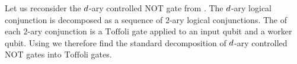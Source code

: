 \begin{example}\label{exa:mcnotDecomposition}
    Let us reconsider the $d$-ary controlled $\mathrm{NOT}$ gate from .
    The $d$-ary logical conjunction is decomposed as a sequence of $2$-ary logical conjunctions.
    The \computationCircuit{} of each $2$-ary conjunction is a $\mathrm{Toffoli}$ gate applied to an input qubit and a worker qubit.
    Using \DecompositionSparsity{} we therefore find the standard decomposition of $d$-ary controlled $\mathrm{NOT}$ gates into $\mathrm{Toffoli}$ gates.
\end{example}